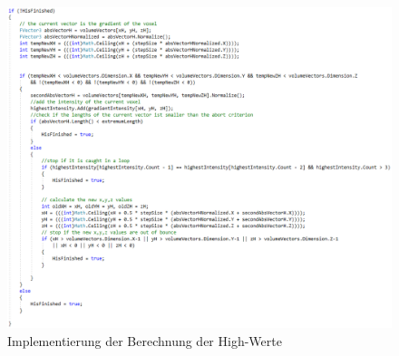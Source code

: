 \begin{figure}[!h] 
\includegraphics[width=1.2\textwidth]{Logos/LH_Code.PNG}
\caption{Implementierung der Berechnung der High-Werte} 
\label{fig:lh_code} 
\end{figure}


